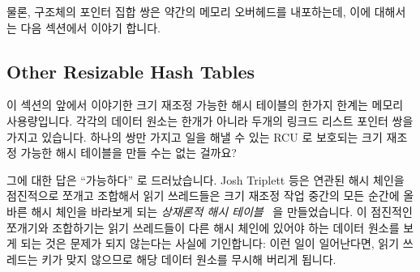 물론,  구조체의 포인터 집합 쌍은 약간의 메모리 오버헤드를
내포하는데, 이에 대해서는 다음 섹션에서 이야기 합니다.

\subsection{Other Resizable Hash Tables}
\label{sec:datastruct:Other Resizable Hash Tables}

이 섹션의 앞에서 이야기한 크기 재조정 가능한 해시 테이블의 한가지 한계는 메모리
사용량입니다.
각각의 데이터 원소는 한개가 아니라 두개의 링크드 리스트 포인터 쌍을 가지고
있습니다.
하나의 쌍만 가지고 일을 해낼 수 있는 RCU 로 보호되는 크기 재조정 가능한 해시
테이블을 만들 수는 없는 걸까요?

그에 대한 답은 ``가능하다'' 로 드러났습니다.
Josh Triplett 등은 연관된 해시 체인을 점진적으로 쪼개고 조합해서 읽기
쓰레드들은 크기 재조정 작업 중간의 모든 순간에 올바른 해시 체인을 바라보게 되는
\emph{상재론적 해시 테이블}~\cite{Triplett:2011:RPHash} 을 만들었습니다.
이 점진적인 쪼개기와 조합하기는 읽기 쓰레드들이 다른 해시 체인에 있어야 하는
데이터 원소를 보게 되는 것은 문제가 되지 않는다는 사실에 기인합니다: 이런 일이
일어난다면, 읽기 쓰레드는 키가 맞지 않으므로 해당 데이터 원소를 무시해 버리게
됩니다.

